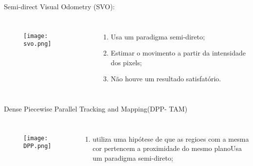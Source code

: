\begin{frame}[c]{Semi-direct Visual Odometry (SVO):}
    \transboxout[duration=0.5]
    \begin{columns}
            \begin{figure}
            \texttt{[image: svo.png]}
            \caption{\cite{SVOFastS44}}
            \end{figure}
            \begin{enumerate}
                \item Usa um paradigma semi-direto;
                \item Estimar o movimento a partir da intensidade dos pixels; 
                \item Não houve um resultado satisfatório. 
            \end{enumerate}
    \end{columns}
\end{frame}
\begin{frame}[c]{Dense Piecewise Parallel Tracking and Mapping(DPP-
TAM)}
    \transboxout[duration=0.5]
    \begin{columns}
            \begin{figure}
            \texttt{[image: DPP.png]}
            \caption{\cite{PDFDPPTA82}}
            \end{figure}
            \begin{enumerate}
                \item utiliza uma hipótese de que as regioes com a mesma cor pertencem a proximidade do mesmo planoUsa um paradigma semi-direto;
            \end{enumerate}
    \end{columns}

\end{frame}
